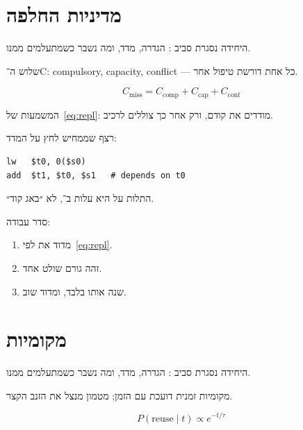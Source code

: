 \chapter{מדיניות החלפה}
\label{ch:repl}

היחידה נסגרת סביב : הגדרה, מדד, ומה נשבר כשמתעלמים ממנו.

\begin{notebox}[frametitle={הערה — מדיניות החלפה}]
שלוש ה־C: compulsory, capacity, conflict — כל אחת דורשת טיפול אחר.
\end{notebox}

\begin{equation}
\label{eq:repl}
C_{\mathrm{miss}} = C_{\mathrm{comp}}+C_{\mathrm{cap}}+C_{\mathrm{conf}}
\end{equation}

המשמעות של~\eqref{eq:repl}: מודדים את  קודם, ורק אחר כך צוללים לרכיב.

רצף שממחיש לחץ על המדד:
\begin{asmblock}
\begin{lstlisting}[style=asm]
lw   $t0, 0($s0)
add  $t1, $t0, $s1   # depends on t0
\end{lstlisting}
\end{asmblock}
התלות על  היא עלות ב־, לא ״באג קוד״.

סדר עבודה:
\begin{enumerate}
\item[(\textbf{א})] מדוד את  לפי~\eqref{eq:repl}.
\item[(\textbf{ב})] זהה גורם שולט אחד.
\item[(\textbf{ג})] שנה אותו בלבד, ומדוד שוב.
\end{enumerate}

\chapter{מקומיות}
\label{ch:locality}

היחידה נסגרת סביב : הגדרה, מדד, ומה נשבר כשמתעלמים ממנו.

\begin{defbox}[frametitle={הגדרה — מקומיות}]
מקומיות זמנית דועכת עם הזמן; מטמון מנצל את הזנב הקצר.
\end{defbox}

\begin{equation}
\label{eq:locality}
P(\mathrm{reuse}\mid t) \propto e^{-t/\tau}
\end{equation}

